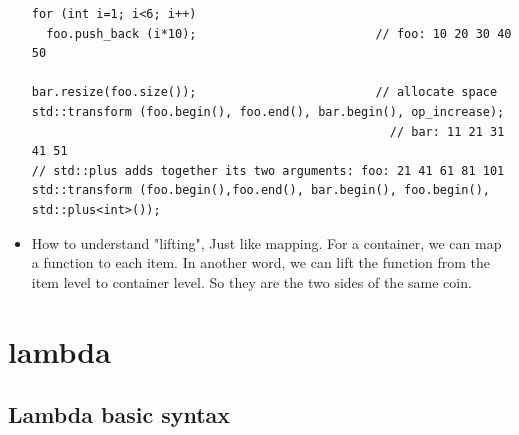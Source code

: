 \documentclass[a4paper,11pt,twoside]{book}
\begin{document}
\begin{itemize}
\begin{lstlisting}
for (int i=1; i<6; i++)
  foo.push_back (i*10);                         // foo: 10 20 30 40 50

bar.resize(foo.size());                         // allocate space
std::transform (foo.begin(), foo.end(), bar.begin(), op_increase);
                                                  // bar: 11 21 31 41 51
// std::plus adds together its two arguments: foo: 21 41 61 81 101
std::transform (foo.begin(),foo.end(), bar.begin(), foo.begin(), std::plus<int>());
\end{lstlisting}

\item How to understand "lifting", Just like mapping. For a container, we can map a function to each item. In another word, we can lift the function from the item level to container level. So they are the two sides of the same coin. 	
\end{itemize}

\section{lambda}
\subsection{Lambda basic syntax}
\end{document}

